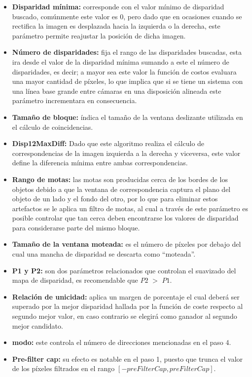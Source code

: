 \begin{itemize}
    \item \textbf{Disparidad mínima:} corresponde con el valor mínimo de disparidad buscado, comúnmente este valor es 0, pero dado que en ocasiones cuando se rectifica la imagen es desplazada hacia la izquierda o la derecha, este parámetro permite reajustar la posición de dicha imagen.
    \item \textbf{Número de disparidades:} fija el rango de las disparidades buscadas, esta ira desde el valor de la disparidad mínima sumando a este el número de disparidades, es decir; a mayor sea este valor la función de costos evaluara una mayor cantidad de píxeles, lo que implica que si se tiene un sistema con una línea base grande entre cámaras en una disposición alineada este parámetro incrementara en consecuencia.
    \item \textbf{Tamaño de bloque:} índica el tamaño de la ventana deslizante utilizada en el cálculo de coincidencias.
    \item \textbf{Disp12MaxDiff:} Dado que este algoritmo realiza el cálculo de correspondencias de la imagen izquierda a la derecha y viceversa, este valor define la diferencia mínima entre ambas correspondencias.
    \item \textbf{Rango de motas:} las motas son producidas cerca de los bordes de los objetos debido a que la ventana de correspondencia captura el plano del objeto de un lado y el fondo del otro, por lo que para eliminar estos artefactos se le aplica un filtro de motas, al cual a través de este parámetro es posible controlar que tan cerca deben encontrarse los valores de disparidad para considerarse parte del mismo bloque.
    \item \textbf{Tamaño de la ventana moteada:} es el número de píxeles por debajo del cual una mancha de disparidad se descarta como ``moteada''. 
    \item \textbf{P1 y P2:} son dos parámetros relacionados que controlan el suavizado del mapa de disparidad, es recomendable que $P2$ $>$ $P1$.
    \item \textbf{Relación de unicidad:} aplica un margen de porcentaje el cual deberá ser superado por la mejor disparidad hallada por la función de coste respecto al segundo mejor valor, en caso contrario se elegirá como ganador al segundo mejor candidato.
    \item \textbf{modo:} este controla el número de direcciones mencionadas en el paso 4.
    \item \textbf{Pre-filter cap:} su efecto es notable en el paso 1, puesto que trunca el valor de los píxeles filtrados en el rango $[-preFilterCap, preFilterCap]$. 
\end{itemize}
